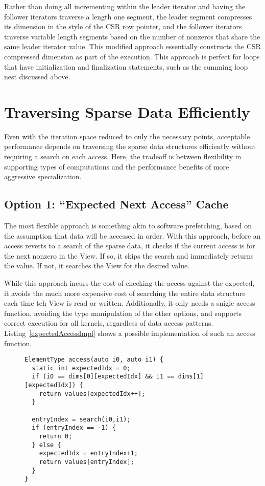 Rather than doing all incrementing within the leader iterator and having the follower iterators traverse a length one segment, the leader segment compresses its dimension in the style of the CSR row pointer, and the follower iterators traverse variable length segments based on the number of nonzeros that share the same leader iterator value.
This modified approach essentially constructs the CSR compressed dimension as part of the execution.
This approach is perfect for loops that have initialization and finalization statements, such as the summing loop nest discussed above. 


\section{Traversing Sparse Data Efficiently}\label{sec:SparseAccess}\label{sec:EfficientTraversal}

Even with the iteration space reduced to only the necessary points, acceptable performance depends on traversing the sparse data structures efficiently without requiring a search on each access.
Here, the tradeoff is between flexibility in supporting types of computations and the performance benefits of more aggressive specialization.

\subsection{Option 1: ``Expected Next Access'' Cache}

The most flexible approach is something akin to software prefetching, based on the assumption that data will be accessed in order. 
With this approach, before an access reverts to a search of the sparse data, it checks if the current access is for the next nonzero in the View.
If so, it skips the search and immediately returns the value.
If not, it searches the View for the desired value.

While this approach incurs the cost of checking the access against the expected, it avoids the much more expensive cost of searching the entire data structure each time teh View is read or written.
Additionally, it only needs a snigle access function, avoiding the type manipulation of the other options, and supports correct execution for all kernels, regardless of data access patterns.
Listing~\ref{expectedAccessImpl} shows a possible implementation of such an access function.
\begin{figure}
\begin{lstlisting}[caption={Possible implementation fo the Expected Next Access approach to efficient data traversal.},label=expectedAccessImpl]
ElementType access(auto i0, auto i1) {
  static int expectedIdx = 0;
  if (i0 == dims[0][expectedIdx] && i1 == dims[1][expectedIdx]) {
    return values[expectedIdx++];
  }
  
  entryIndex = search(i0,i1);
  if (entryIndex == -1) {
    return 0;
  } else {
    expectedIdx = entryIndex+1;
    return values[entryIndex];
  }
}
\end{lstlisting}
\end{figure}


